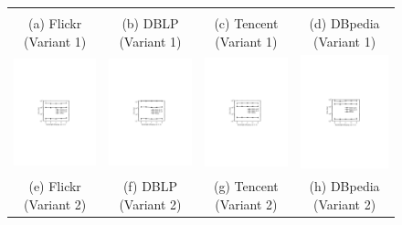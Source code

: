 \begin{figure}[htb]
\begin{tabular}{c c c c}
\begin{minipage}{3.325cm}
  \end{minipage}
  \\
  \small (a) Flickr (Variant 1)
  &
  \small (b) DBLP (Variant 1)
  &
  \small (c) Tencent (Variant 1)
  &
  \small (d) DBpedia (Variant 1)
      \\
  \begin{minipage}{3.325cm}
  \includegraphics[width=3.725cm]{figures/flickrv2}
  \end{minipage}
  &
  \begin{minipage}{3.325cm}
  \includegraphics[width=3.725cm]{figures/dblpv2}
  \end{minipage}
  &
  \begin{minipage}{3.325cm}
  \includegraphics[width=3.725cm]{figures/tencentv2}
  \end{minipage}
  &
  \begin{minipage}{3.325cm}
  \includegraphics[width=3.725cm]{figures/dbpediav2}
  \end{minipage}
  \\
  \small (e) Flickr (Variant 2)
  &
  \small (f) DBLP (Variant 2)
  &
  \small (g) Tencent (Variant 2)
  &
  \small (h) DBpedia (Variant 2)
\\
  


\end{tabular}
\end{figure}

